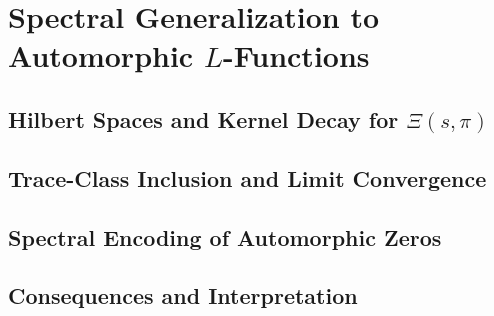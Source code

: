 \section{Spectral Generalization to Automorphic \texorpdfstring{$L$}{L}-Functions}
\label{sec:spectral_generalization}




\subsection{Hilbert Spaces and Kernel Decay for \texorpdfstring{$\Xi(s,\pi)$}{Xi(s, pi)}}






\subsection{Trace-Class Inclusion and Limit Convergence}




\subsection{Spectral Encoding of Automorphic Zeros}










\subsection{Consequences and Interpretation}






